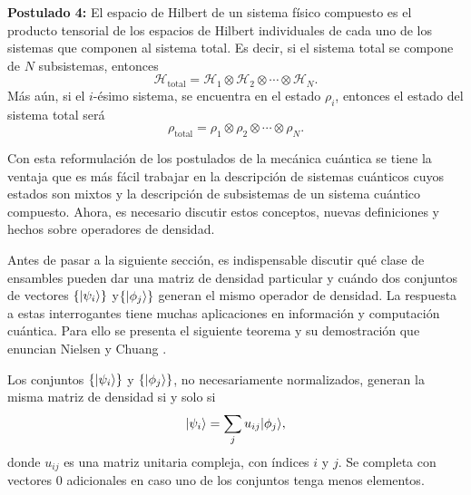 \textbf{Postulado 4:} El espacio de Hilbert de un sistema físico compuesto es el producto tensorial de los espacios de Hilbert individuales de cada uno de los sistemas que componen al sistema total. Es decir, si el sistema total se compone de $N$ subsistemas, entonces \begin{equation}\label{Htotal4postulado}
	\mathcal{H}_{\text{total}}=\mathcal{H}_1\otimes \mathcal{H}_2\otimes \cdots \otimes \mathcal{H}_N.
\end{equation}
 Más aún, si el $i$-ésimo sistema, se encuentra en el
estado $\rho_i$, entonces el estado del sistema total será
\begin{equation}\label{rhototal4postulado}
	\rho_{\text{total}}=\rho_1\otimes \rho_2 \otimes \cdots \otimes \rho_N.
\end{equation}


\setlength{\leftskip}{0pt}

Con esta reformulación de los postulados de la mecánica cuántica se tiene la
ventaja que es más fácil trabajar en la descripción de sistemas cuánticos cuyos estados son mixtos y la descripción de subsistemas de un sistema cuántico compuesto. Ahora, es necesario discutir estos conceptos, nuevas definiciones y hechos sobre operadores de densidad. 


Antes de pasar a la siguiente sección, es indispensable discutir qué clase de
ensambles pueden dar una matriz de densidad particular y cuándo dos conjuntos
de vectores $\{|\psi_i\rangle\}$ y$ \{|\phi_j\rangle \}$ generan el mismo operador de
densidad. La respuesta a estas interrogantes tiene muchas aplicaciones en
información y computación cuántica. Para ello se presenta el siguiente
teorema y su demostración que enuncian Nielsen y Chuang
{\cite{nielsen_chuang_2010}}. 
\begin{theorem}
Los conjuntos $\{|\psi_i\rangle\}$ y $ \{|\phi_j\rangle \}$, no necesariamente
normalizados, generan la misma matriz de densidad si y solo si
\begin{equation}\label{teorema2.4}
|\psi_i\rangle= \sum_{j}u_{ij}|\phi_j\rangle,
\end{equation} donde $u_{ij}$ es una matriz unitaria compleja, con índices $i$ y $j$. Se completa con vectores 0 adicionales en caso uno de los conjuntos tenga menos elementos.
\end{theorem}

